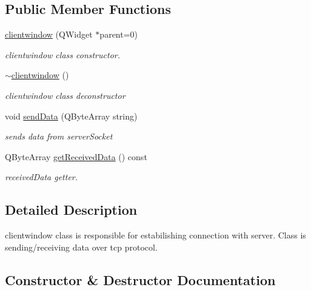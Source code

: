\subsection*{Public Member Functions}
\begin{DoxyCompactItemize}
\item 
\mbox{\hyperlink{classclientwindow_a9ea65c58093430993fc64bedab0ee6e3}{clientwindow}} (Q\+Widget $\ast$parent=0)
\begin{DoxyCompactList}\small\item\em clientwindow class constructor. \end{DoxyCompactList}\item 
\mbox{\hyperlink{classclientwindow_a53333bf0d133c70836f94ba20242fd36}{$\sim$clientwindow}} ()
\begin{DoxyCompactList}\small\item\em clientwindow class deconstructor \end{DoxyCompactList}\item 
void \mbox{\hyperlink{classclientwindow_af4fa9df47a939b45246e7686d0f8c569}{send\+Data}} (Q\+Byte\+Array string)
\begin{DoxyCompactList}\small\item\em sends data from server\+Socket \end{DoxyCompactList}\item 
Q\+Byte\+Array \mbox{\hyperlink{classclientwindow_aef46aaa18fbaff0c95db9ae6c24a8847}{get\+Received\+Data}} () const
\begin{DoxyCompactList}\small\item\em received\+Data getter. \end{DoxyCompactList}\end{DoxyCompactItemize}


\subsection{Detailed Description}
clientwindow class is responsible for estabilishing connection with server. Class is sending/receiving data over tcp protocol. 

\subsection{Constructor \& Destructor Documentation}
\mbox{\label{classclientwindow_a9ea65c58093430993fc64bedab0ee6e3}} 
